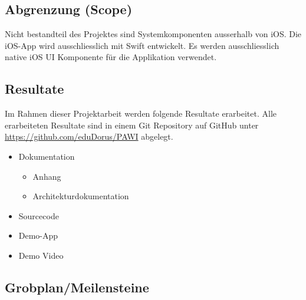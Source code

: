 \subsection{Abgrenzung (Scope)}
Nicht bestandteil des Projektes sind Systemkomponenten ausserhalb von iOS. Die iOS-App wird ausschliesslich mit Swift entwickelt. Es werden ausschliesslich native iOS UI Komponente für die Applikation verwendet.

\subsection{Resultate}
Im Rahmen dieser Projektarbeit werden folgende Resultate erarbeitet. Alle erarbeiteten Resultate sind in einem Git Repository auf GitHub unter \url{https://github.com/eduDorus/PAWI} abgelegt.
 
\begin{itemize}
    \item Dokumentation
    \begin{itemize}
        \item Anhang
        \item Architekturdokumentation
    \end{itemize}
    \item Sourcecode
    \item Demo-App
    \item Demo Video
\end{itemize}

\subsection{Grobplan/Meilensteine}


